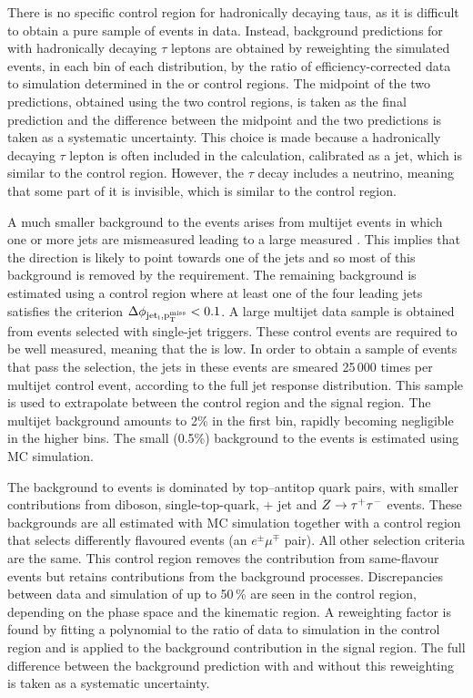 \documentclass[cernpreprint,txfonts,UKenglish,texlive=2016]{\ATLASLATEXPATH atlasdoc}
\begin{document}
There is no specific  \Wtaunu{} control region for hadronically
decaying taus, as it is difficult to
obtain a pure sample of  \Wtaunu{} events in data. Instead, background predictions for 
\Wtaunu{} with hadronically decaying $\tau$ leptons are obtained by reweighting the 
simulated \Wtaunu{} events, in each bin of each distribution, by the ratio of 
efficiency-corrected data to simulation determined in the \Wmunu{} or \Wenu control regions. 
The midpoint of the two predictions, obtained using the two control regions, is taken as the final 
\Wtaunu{} prediction and the difference between the midpoint and the
two predictions is taken as a systematic uncertainty. This choice is
made because a hadronically decaying $\tau$ lepton is often included in
the \ptmiss{} calculation, calibrated as a jet, which is similar to
the \Wenu{} control region. However, the $\tau$ decay includes a
neutrino, meaning that some part of it is invisible, which is similar
to the \Wmunu{} control region.


A much smaller background to the \ptmissjet{} events arises from multijet
events in which one or more jets are mismeasured leading to a
large measured \ptmiss. This implies that the \ptmiss{} direction is likely to point
towards one of the
jets and so most of this background is removed by
the \dphiptmissj{} requirement. The remaining
background is estimated  using a control region where at least
one of the four leading jets satisfies the criterion $ \Delta\phi_{\mathrm{jet_{i},p_\mathrm{T}^\mathrm{miss}}} < 0.1$.
A large multijet data sample is obtained from events selected with
single-jet triggers. These control events are required to be well
measured, meaning that the \ptmiss{} is low. In order to obtain a
sample of events that pass the \ptmiss{} selection, the jets in these
events are smeared 25\,000 times per multijet control event, according to the
full jet response distribution. This sample is used to extrapolate
between the control region and the signal region.
The multijet background amounts
to 2\%{} in the first \ptmiss{} bin, rapidly becoming negligible in
the higher \ptmiss{} bins. 
The small (0.5\%{}) \Zgll{} background to the  \ptmissjet{}
events is estimated using MC simulation. 

The background to \lljet{} events is dominated by top--antitop quark pairs,
with smaller contributions from diboson, single-top-quark, \W{} + jet and $Z\to\tau^{+}\tau^{-}$
events. These backgrounds are all estimated with MC simulation
together with a control region that selects differently flavoured 
\lljet{} events (an $e^{\pm}\mu^{\mp}$ pair). All other selection criteria are the
same. This control region removes the contribution from
same-flavour \lljet{} events but retains contributions from the
background processes. Discrepancies between data and simulation of up to 50\,\% are
seen in the control region, depending on the phase space and the kinematic region.
A reweighting factor is found by fitting a polynomial to the ratio of
data to simulation in the control region and is applied to the
background contribution in the signal region. The full difference
between the background prediction with and without this reweighting is
taken as a systematic uncertainty.
\end{document}
